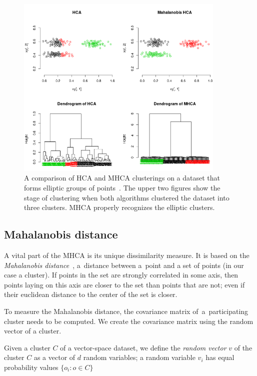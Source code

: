 \begin{figure}[t]\centering
	\includegraphics[width=10cm]{img/mhca}
	\caption{A comparison of HCA and MHCA clusterings on a dataset that forms elliptic groups of points~\cite{fivser2012detection}. The upper two figures show the stage of clustering when both algorithms clustered the dataset into three clusters. MHCA properly recognizes the elliptic clusters.}
	\label{fig01:mhca}
\end{figure}

\subsection{Mahalanobis distance}

A vital part of the MHCA is its unique dissimilarity measure. It is based on the \emph{Mahalanobis distance}~\cite{mahalanobis1936generalized}, a~distance between a~point and a set of points (in our case a cluster). If points in the set are strongly correlated in some axis, then points laying on this axis are closer to the set than points that are not; even if their euclidean distance to the center of the set is closer.

To measure the Mahalanobis distance, the covariance matrix of~a~participating cluster needs to be computed. We create the covariance matrix using the random vector of a cluster.

\begin{defn}
	Given a cluster $C$ of a vector-space dataset, we define the \emph{random vector} $v$ of the cluster $C$ as a vector of $d$  random variables; a random variable $v_i$ has equal probability values $\{o_i:o\in C\}$
\end{defn}

